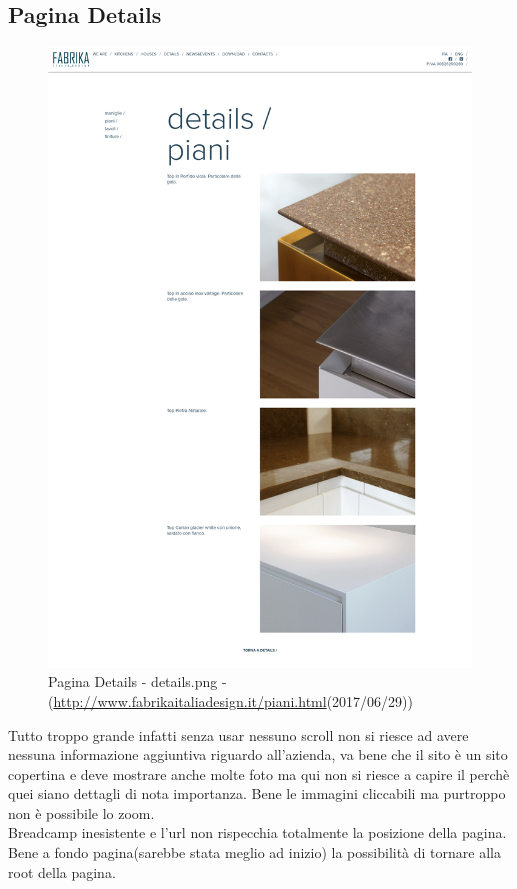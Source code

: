 \documentclass[../Relazione.tex]{subfiles}
\begin{document}
    \subsection{Pagina Details}
        \begin{figure}[H]
            \centering
            \includegraphics[width=\textwidth]{img/Details.png}
            \caption{Pagina Details - details.png - (\url{http://www.fabrikaitaliadesign.it/piani.html}(2017/06/29))}
        \end{figure}
        Tutto troppo grande infatti senza usar nessuno scroll non si riesce ad avere nessuna informazione aggiuntiva riguardo all'azienda, va bene che il sito è un sito copertina e deve mostrare anche molte foto ma qui non si riesce a capire il perchè quei siano dettagli di nota importanza.
        Bene le immagini cliccabili ma purtroppo non è possibile lo zoom.\\
        Breadcamp inesistente e l'url non rispecchia totalmente la posizione della pagina.\\
        Bene a fondo pagina(sarebbe stata meglio ad inizio) la possibilità di tornare alla root della pagina.
\end{document}

